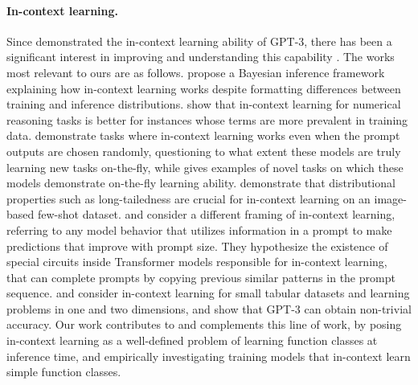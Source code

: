 \documentclass{article}
\begin{document}
\paragraph{In-context learning.} Since \citet{brown2020language} demonstrated the in-context learning ability of GPT-3, there has been a significant interest in improving and understanding this capability \citep{liu2021makes, min2021noisy, zhao2021calibrate, lu2021fantastically, rubin2021learning, min2021metaicl, chen2021meta, mishra2021reframing, lampinen2022can}.
The works most relevant to ours are as follows.
\citet{xie2022an} propose a Bayesian inference framework explaining how in-context learning works despite formatting differences between training and inference distributions. \citet{razeghi2022impact} show that in-context learning for numerical reasoning tasks is better for instances whose terms are more prevalent in training data. \citet{min2021noisy} demonstrate tasks where in-context learning  works  even when the prompt outputs are chosen randomly, questioning to what extent these models are truly  learning new tasks on-the-fly, while \citet{rong_2021} 
gives examples of novel tasks on which these models demonstrate on-the-fly learning ability. \citet{chan2022data} demonstrate that distributional properties such as long-tailedness are crucial for in-context learning on an image-based few-shot dataset. \citet{olsson2022context} and  \citet{elhage2021mathematical} consider a different framing of in-context learning, referring to any model behavior that utilizes information in a prompt to make predictions that improve with prompt size. They hypothesize the existence of special circuits inside Transformer models responsible for in-context learning, that can complete prompts by copying previous similar patterns in the prompt sequence. 
\citet{pesut2022who} and \citet[Table~16]{dinh2022lift} consider in-context learning for small tabular datasets and learning problems in one and two dimensions, and show that GPT-3 can obtain non-trivial accuracy.
Our work contributes to and complements this line of work, by posing in-context learning as a well-defined problem of learning function classes at inference time, and empirically investigating training models that in-context learn simple function classes.
\end{document}
